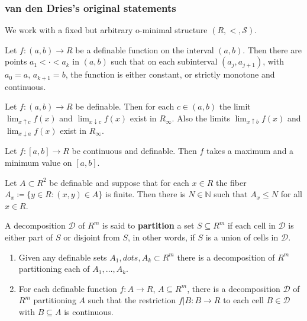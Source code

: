 \documentclass[
	fontsize=10pt, %
]{kaohandt}
\begin{document}
\subsubsection{van den Dries's original statements}

We work with a fixed but arbitrary o-minimal structure $(R,<,\mathcal{S})$.

\begin{theorem}
    Let $f: (a,b)\to R$ be a definable function on the interval $(a,b)$.
    Then there are points $a_1 < \cdot < a_k$ in $(a,b)$ such that on each subinterval $(a_j,a_{j+1})$,
    with $a_0 = a$, $a_{k+1} = b$,
    the function is either constant, or strictly monotone and continuous.
\end{theorem}

\begin{corollary}
    Let $f: (a,b) \to R$ be definable.
    Then for each $c\in (a,b)$ the limit $\lim_{x\uparrow c}f(x)$
    and $\lim_{x\downarrow c}f(x)$ exist in $R_{\infty}$.
    Also the limits $\lim_{x\uparrow b}f(x)$ and $\lim_{x\downarrow a}f(x)$ exist in $R_{\infty}$.
\end{corollary}

\begin{corollary}
    Let $f: [a,b]\to R$ be continuous and definable.
    Then $f$ takes a maximum and a minimum value on $[a,b]$.
\end{corollary}

\begin{lemma}
    Let $A \subset R^2$ be definable and suppose that for each $x\in R$
    the fiber $A_x \coloneq \{y\in R\colon (x,y)\in A\}$ is finite.
    Then there is $N \in \mathbb{N}$ such that $A_x \le N$ for all $x\in R$.
\end{lemma}

A decomposition $\mathcal{D}$ of $R^m$ is said to \textbf{partition}
a set $S \subseteq R^m$ if each cell in $\mathcal{D}$ is
either part of $S$ or disjoint from $S$,
in other words, if $S$ is a union of cells in $\mathcal{D}$.
\begin{theorem}
    \hfill
    \begin{enumerate}[label = {$\mathrm{(\Roman*_{m})}$}]
        \item Given any definable sets $A_1,dots,A_k \subset R^m$ there is a decomposition of $R^m$ partitioning each of $A_1,\dots,A_k$.
        \item For each definable function $f: A \to R$, $A \subseteq R^m$,
        there is a decomposition $\mathcal{D}$ of $R^m$ partitioning $A$ such that 
        the restriction $f|B: B \to R$ to each cell $B \in \mathcal{D}$ with $B \subseteq A$ is continuous.
    \end{enumerate}
\end{theorem}
\end{document}
